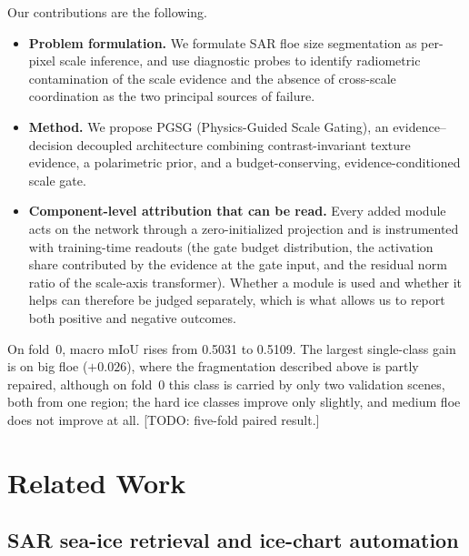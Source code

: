 \documentclass[preprint,12pt,authoryear]{elsarticle}
\begin{document}
Our contributions are the following.
\begin{itemize}
\item \textbf{Problem formulation.} We formulate SAR floe size segmentation as
      per-pixel scale inference, and use diagnostic probes to identify
      radiometric contamination of the scale evidence and the absence of
      cross-scale coordination as the two principal sources of failure.
\item \textbf{Method.} We propose PGSG (Physics-Guided Scale Gating), an
      evidence--decision decoupled architecture combining contrast-invariant
      texture evidence, a polarimetric prior, and a budget-conserving,
      evidence-conditioned scale gate.
\item \textbf{Component-level attribution that can be read.} Every added module
      acts on the network through a zero-initialized projection and is
      instrumented with training-time readouts (the
      gate budget distribution, the activation share contributed by the evidence
      at the gate input, and the residual norm ratio of the scale-axis
      transformer). Whether a module is used and whether it helps
      can therefore be judged separately, which is what allows us to report both
      positive and negative outcomes.
\end{itemize}
On fold~0, macro mIoU rises from 0.5031 to 0.5109. The largest single-class gain
is on big floe ($+0.026$), where the fragmentation described above is partly
repaired, although on fold~0 this class is carried by only two validation
scenes, both from one region; the hard ice classes improve only slightly, and medium floe does not
improve at all. [TODO: five-fold paired result.]

\section{Related Work}
\label{sec:related}

\subsection{SAR sea-ice retrieval and ice-chart automation}
\end{document}
